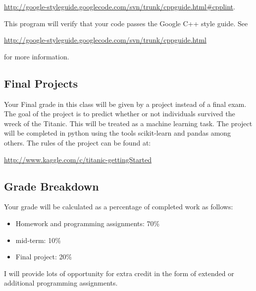 \documentclass[]{article}
\begin{document}
\url{http://google-styleguide.googlecode.com/svn/trunk/cppguide.html#cpplint}.  

\noindent This program will verify that your code passes the Google C++ style guide.  See 

\url{http://google-styleguide.googlecode.com/svn/trunk/cppguide.html}

\noindent for more information.  

\subsection{Final Projects}
Your Final grade in this class will be given by a project instead of a final exam.  The goal of the project is to predict whether or not individuals survived the wreck of the Titanic.  This will be treated as a machine learning task.  The project will be completed in python using the tools scikit-learn and pandas among others.  The rules of the project can be found at:

\url{http://www.kaggle.com/c/titanic-gettingStarted}



\subsection{Grade Breakdown}
Your grade will be calculated as a percentage of completed work as follows:
\begin{itemize}
\item Homework and programming assignments: 70\%
\item mid-term: 10\%
\item Final project: 20\%
\end{itemize}
I will provide lots of opportunity for extra credit in the form of extended or additional programming assignments.
\end{document}
